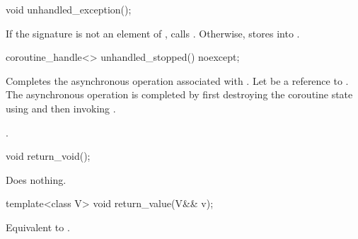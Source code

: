%
\begin{itemdecl}
void unhandled_exception();
\end{itemdecl}
\begin{itemdescr}
\pnum
\effects
If the signature  is not an element
of , calls .
Otherwise, stores  into
.
\end{itemdescr}

%
\begin{itemdecl}
coroutine_handle<> unhandled_stopped() noexcept;
\end{itemdecl}
\begin{itemdescr}
\pnum
\effects
Completes the asynchronous operation associated with .
Let  be a reference to .
The asynchronous operation is completed by first
destroying the coroutine state
using  and then
invoking .
\end{itemdescr}
\begin{itemdescr}
\pnum
\returns
{}.
\end{itemdescr}

%
\begin{itemdecl}
void return_void();
\end{itemdecl}
\begin{itemdescr}
\pnum
\effects
Does nothing.
\end{itemdescr}

%
\begin{itemdecl}
template<class V>
  void return_value(V&& v);
\end{itemdecl}
\begin{itemdescr}
\pnum
\effects
Equivalent to .
\end{itemdescr}

